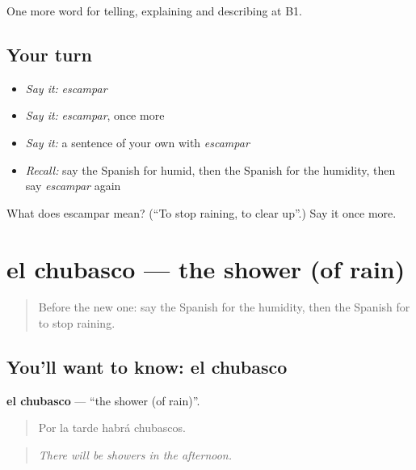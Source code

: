 \begin{grammarlens}[title={What you've built}]
One more word for telling, explaining and describing at B1.
\end{grammarlens}

\subsection*{Your turn}
\begin{itemize}
\raggedright
  \item \emph{Say it:} \emph{escampar}
  \item \emph{Say it:} \emph{escampar}, once more
  \item \emph{Say it:} a sentence of your own with \emph{escampar}
  \item \emph{Recall:} say the Spanish for humid, then the Spanish for the humidity, then say \emph{escampar} again
\end{itemize}

\begin{tcolorbox}[breakable,colback=teal!4,colframe=teal!35!black,title={Before you move on}]
What does escampar mean? (\textquotedblleft{}To stop raining, to clear up\textquotedblright{}.) Say it once more.
\end{tcolorbox}
\section[el chubasco]{el chubasco — the shower (of rain)}

\label{lesson:ES-C697-chubasco}



\begin{quote}
Before the new one: say the Spanish for the humidity, then the Spanish for to stop raining.
\end{quote}

\subsection*{You'll want to know: el chubasco}
\textbf{el chubasco} — \textquotedblleft{}the shower (of rain)\textquotedblright{}.

\begin{quote}
Por la tarde habrá chubascos.
\end{quote}

\begin{quote}
\emph{There will be showers in the afternoon.}
\end{quote}

